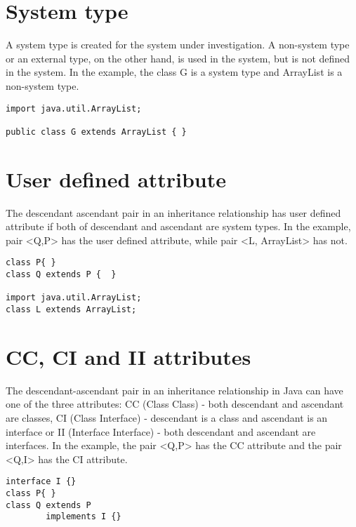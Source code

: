 \documentclass{uvamscse}
\begin{document}
\section{System type}
\begin{multicols}{2}
A system type is created for the system under investigation. A non-system type or an external type, on the other hand, is used in the system, but is not defined in the system. In the example, the class G is a system type and ArrayList is a non-system type.
\columnbreak
\begin{verbatim}
import java.util.ArrayList;  
    
public class G extends ArrayList { }
\end{verbatim}
\end{multicols}


\section{User defined attribute}
\begin{multicols}{2}
The descendant ascendant pair in an inheritance relationship has user defined attribute if both of descendant and ascendant are system types. In the example, pair <Q,P> has the user defined attribute, while pair <L, ArrayList> has not.
\columnbreak
\begin{verbatim}
class P{ }
class Q extends P {  }
   
import java.util.ArrayList;
class L extends ArrayList;
\end{verbatim}
\end{multicols}



\section{CC, CI and II attributes}
\begin{multicols}{2}
The descendant-ascendant pair in an inheritance relationship in Java can have one of the three attributes: CC (Class Class) - both descendant and ascendant are classes, CI (Class Interface) - descendant is a class and ascendant is an interface or II (Interface Interface) - both descendant and ascendant are interfaces. In the example, the pair <Q,P> has the CC attribute and the pair <Q,I> has the CI attribute.
\columnbreak
\begin{verbatim}
interface I {}
class P{ }
class Q extends P 
        implements I {}  
\end{verbatim}
\end{multicols}
\end{document}
